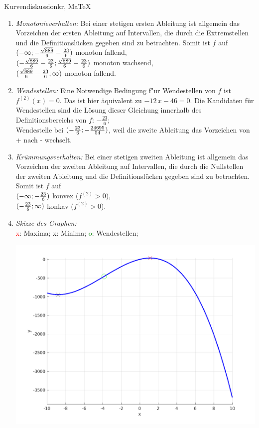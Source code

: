 \begin{MAufgabe}{Kurvendiskussion}{kr, MaTeX}
\begin{enumerate}
 \item \emph{Monotonieverhalten:} 
 Bei einer stetigen ersten Ableitung ist allgemein das Vorzeichen der ersten Ableitung auf Intervallen, die durch die Extremstellen und die Definitionsl\"ucken gegeben sind zu betrachten. Somit ist $f$ auf \\ 
 $(-\infty; - \frac{\sqrt{889}}{6} - \frac{23}{6})$ monoton fallend, \\ 
 $( - \frac{\sqrt{889}}{6} - \frac{23}{6};\frac{\sqrt{889}}{6} - \frac{23}{6})$ monoton  wachsend, \\ 
 $(\frac{\sqrt{889}}{6} - \frac{23}{6}; \infty)$ monoton fallend. \\ 
 \item \emph{Wendestellen:} 
 Eine Notwendige Bedingung f"ur Wendestellen von $f$ ist $f^{(2)}(x)=0$. 
 Das ist hier \"aquivalent zu $ - 12\, x - 46=0$. 
 Die Kandidaten f\"ur Wendestellen sind die L\"osung dieser Gleichung innerhalb des Definitionsbereichs von $f$: $- \frac{23}{6}$; \\ 
 Wendestelle bei $(- \frac{23}{6};- \frac{24695}{54})$, weil die zweite Ableitung das Vorzeichen von + nach - wechselt. \\ 
 \item \emph{Kr\"ummungsverhalten:} 
 Bei einer stetigen zweiten Ableitung ist allgemein das Vorzeichen der zweiten Ableitung auf Intervallen, die durch die Nullstellen der zweiten Ableitung und die Definitionsl\"ucken gegeben sind zu betrachten. 
 Somit ist $f$ auf \\ 
 $(-\infty ;- \frac{23}{6})$  konvex ($f^{(2)}>0$), \\ 
 $(- \frac{23}{6}; \infty)$  konkav ($f^{(2)}>0$). \\ 
 \item \emph{Skizze des Graphen:} \\ 
 {\textcolor{red} x}: Maxima; {\textcolor{black} x}: Minima; {\textcolor{green} o}: Wendestellen; 
  \begin{center}
  \includegraphics[width=0.8\linewidth]{Abb_zur_Ag_autogenerated_fractions_19.png} \end{center}
  
 \end{enumerate}
 \else\relax\fi
  \end{MAufgabe}